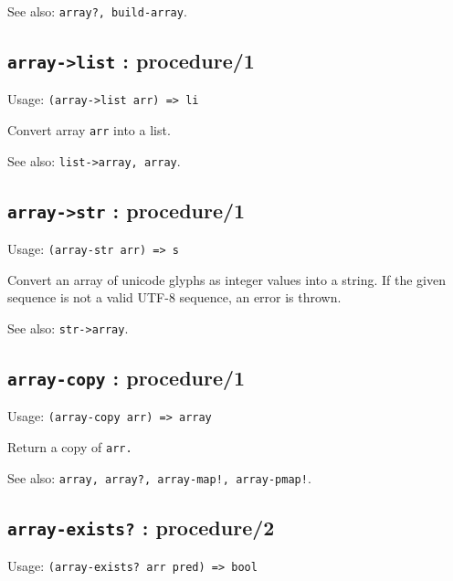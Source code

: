 \documentclass[
]{article}
\newcommand{\passthrough}[1]{#1}
\begin{document}
See also: \passthrough{\lstinline!array?, build-array!}.

\hypertarget{array-list-procedure1-1}{%
\subsection{\texorpdfstring{\texttt{array-\textgreater{}list} :
procedure/1}{array-\textgreater list : procedure/1}}\label{array-list-procedure1-1}}

Usage: \passthrough{\lstinline!(array->list arr) => li!}

Convert array \passthrough{\lstinline!arr!} into a list.

See also: \passthrough{\lstinline!list->array, array!}.

\hypertarget{array-str-procedure1-1}{%
\subsection{\texorpdfstring{\texttt{array-\textgreater{}str} :
procedure/1}{array-\textgreater str : procedure/1}}\label{array-str-procedure1-1}}

Usage: \passthrough{\lstinline!(array-str arr) => s!}

Convert an array of unicode glyphs as integer values into a string. If
the given sequence is not a valid UTF-8 sequence, an error is thrown.

See also: \passthrough{\lstinline!str->array!}.

\hypertarget{array-copy-procedure1-1}{%
\subsection{\texorpdfstring{\texttt{array-copy} :
procedure/1}{array-copy : procedure/1}}\label{array-copy-procedure1-1}}

Usage: \passthrough{\lstinline!(array-copy arr) => array!}

Return a copy of \passthrough{\lstinline!arr.!}

See also:
\passthrough{\lstinline"array, array?, array-map!, array-pmap!"}.

\hypertarget{array-exists-procedure2-1}{%
\subsection{\texorpdfstring{\texttt{array-exists?} :
procedure/2}{array-exists? : procedure/2}}\label{array-exists-procedure2-1}}

Usage: \passthrough{\lstinline!(array-exists? arr pred) => bool!}
\end{document}
